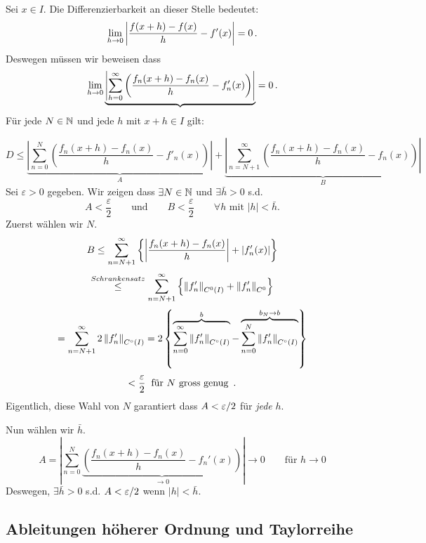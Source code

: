 
\begin{Bew}
  Sei $x\in I$. Die Differenzierbarkeit an dieser Stelle bedeutet:
  \[\displaystyle\lim_{h\rightarrow0}\left|\frac{f(x+h)-f(x)}{h}-f'(x)\right|=0\, .\]
Deswegen m\"ussen wir beweisen dass
  \[\displaystyle\lim_{h\rightarrow0}\underbrace{\left|\sum^\infty_{h=0}\left( \frac{f_n(x+h)-f_n(x)}{h}-f_n'(x) \right)
\right|}=0\, .\]
F\"ur jede $N\in \mathbb{N}$ und jede $h$ mit $x+h\in I$ gilt:
  
\[D\leq \underbrace{\left|\sum_{n=0}^N\left(\frac{f_n(x+h)-f_n(x)}{h}-f'_n(x)\right)\right|}_{A} + 
\underbrace{\left|\sum_{n=N+1}^\infty\left(\frac{f_n(x+h)-f_n(x)}{h}-f_n(x)\right)\right|}_{B}\]
Sei $\varepsilon>0$ gegeben. Wir zeigen dass $\exists N\in \mathbb{N}$ und 
$\exists \bar h > 0$ s.d.
\[
A<\frac{\varepsilon}{2} \qquad \mbox{und}\qquad  
B<\frac{\varepsilon}{2} \qquad \forall h \mbox{ mit $|h|< \bar{h}$}.
\] 
Zuerst w\"ahlen wir $N$. 
\[B\leq \sum^\infty_{n=N+1}\left\{ \left|\frac{f_n(x+h)-f_n(x)}{h}\right|+\mathopen| f_n'(x) \mathclose| \right\}\]
\[\stackrel{Schrankensatz}{\leq} 
\sum^\infty_{n=N+1}\left\{ \left\| f_n' \right\|_{C^0 (I)}+\left\| f_n' \right\|_{C^0} \right\}\]
\[= \sum^\infty_{n=N+1}2\left\| f_n' \right\|_{C^\circ(I)}=
2\left\{\overbrace{\sum^\infty_{n=0} \left\| f_n' \right\|_{C^\circ(I)}}^{b} - 
\overbrace{\sum^N_{n=0}\left\| f_n' \right\|_{C^\circ(I)}}^{b_N\to b}\right\}\]
  \[<\frac{\varepsilon}{2}\hspace{2mm}\text{für $N$ gross genug\, .}\]
Eigentlich, diese Wahl von $N$ garantiert dass $A<\varepsilon/2$ f\"ur {\em jede} $h$.

Nun w\"ahlen wir $\bar{h}$.
\[A=\left|\sum_{n=0}^N\underbrace{\left( \frac{f_n(x+h)-f_n(x)}{h}-f_n'(x) \right)}_{\rightarrow 0}\right|
\to 0 \qquad \mbox{f\"ur $h\to 0$}\]
Deswegen, $\exists \bar{h}>0$ s.d. $A< \varepsilon/2$ wenn $|h|< \bar{h}$.
\end{Bew}
\subsection{Ableitungen h\"oherer Ordnung und Taylorreihe}


